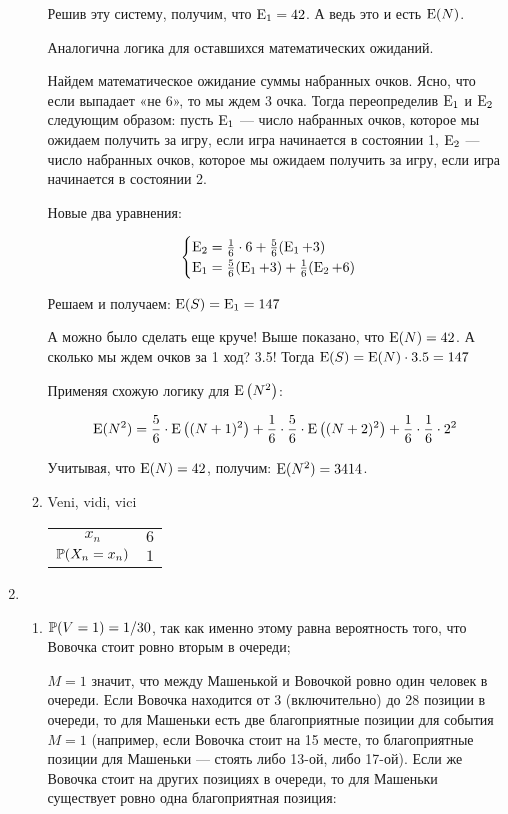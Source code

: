 \begin{enumerate}
\begin{enumerate}
Решив эту систему, получим, что $\E_1 = 42$. А ведь это и есть $\E(N)$.

Аналогична логика для оставшихся математических ожиданий.

Найдем математическое ожидание суммы набранных очков. Ясно, что если выпадает «не 6»,
то мы ждем 3 очка. Тогда переопределив $\E_1$ и $\E_2$ следующим образом: пусть $\E_1$ —
число набранных очков, которое мы ожидаем получить за игру, если игра начинается
в состоянии 1, $\E_2$ — число набранных очков, которое мы ожидаем получить за игру,
если игра начинается в состоянии 2.

Новые два уравнения:

\[
\begin{cases} \E_2 = \frac{1}{6} \cdot 6 +  \frac{5}{6} (\E_1 + 3)   \\
\E_1 =  \frac{5}{6} (\E_1 + 3) + \frac{1}{6} ( \E_2 + 6) \end{cases}
\]

Решаем и получаем: $\E(S) = \E_1 = 147$

А можно было сделать еще круче! Выше показано, что  $\E(N) = 42$.
А сколько мы ждем очков за 1 ход? 3.5! Тогда $\E(S) = \E(N) \cdot 3.5 = 147$

Применяя схожую логику для $\E\left(N^2\right)$:

\[
\E(N^2) = \frac{5}{6} \cdot \E\left((N + 1)^2\right) + \frac{1}{6} \cdot \frac{5}{6}
\cdot \E\left((N + 2)^2\right) + \frac{1}{6} \cdot \frac{1}{6} \cdot 2^2
\]

Учитывая, что $\E(N) = 42$, получим: $\E(N^2) = 3414$.

\item Veni, vidi, vici
\begin{center}
  \begin{tabular}{@{}cc@{}}
  \toprule
  $x_n$       & $6$ \\
  $\P(X_n = x_n)$ & $1$ \\ \bottomrule
  \end{tabular}
\end{center}
\end{enumerate}

\item
\begin{enumerate}
\item $\P(V = 1) = 1/30$, так как именно этому равна вероятность того, что
Вовочка стоит ровно вторым в очереди;

$M = 1$ значит, что между Машенькой и Вовочкой ровно один человек в очереди.
Если Вовочка находится от 3 (включительно) до 28 позиции в очереди, то для
Машеньки есть две благоприятные позиции для события $M = 1$ (например, если
Вовочка стоит на 15 месте, то благоприятные позиции для Машеньки — стоять либо
13-ой, либо 17-ой). Если же Вовочка стоит на других позициях в очереди, то для
Машеньки существует ровно одна благоприятная позиция:


\end{enumerate}
\end{enumerate}
